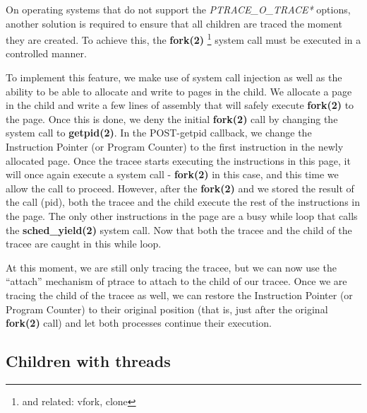 \documentclass[a4paper, 10pt]{report}
\begin{document}
On operating systems that do not support the \textit{PTRACE\_O\_TRACE*} options,
another solution is required to ensure that all children are traced the moment
they are created. To achieve this, the \textbf{fork(2)}
\footnote{and related: vfork, clone} system call must be executed in a
controlled manner.

To implement this feature, we make use of system call injection as well as the
ability to be able to allocate and write to pages in the child. We allocate a
page in the child and write a few lines of assembly that will safely execute
\textbf{fork(2)} to the page. Once this is done, we deny the initial
\textbf{fork(2)} call by changing the system call to \textbf{getpid(2)}.
In the POST-getpid callback, we change the Instruction Pointer
(or Program Counter) to the first instruction in the newly allocated page.
Once the tracee starts executing the instructions in this
page, it will once again execute a system call - \textbf{fork(2)} in this case,
and this time we allow the call to proceed. However, after the \textbf{fork(2)}
and we stored the result of the call (pid), both the tracee and the child
execute the rest of the instructions in the page. The only other instructions
in the page are a busy while loop that calls the \textbf{sched\_yield(2)}
system call. Now that both the tracee and the child of the tracee are caught
in this while loop.

At this moment, we are still only tracing the tracee, but we can now use the
``attach'' mechanism of ptrace to attach to the child of our tracee. Once we are
tracing the child of the tracee as well, we can restore the Instruction Pointer
(or Program Counter) to their original position (that is, just after the
original \textbf{fork(2)} call) and let both processes continue their execution.



%

\subsection{Children with threads}


\end{document}
